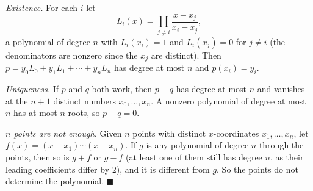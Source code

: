 \emph{Existence.} For each $i$ let
\[L_i(x)=\prod_{j\ne i}\dfrac{x-x_j}{x_i-x_j},\]
a polynomial of degree $n$ with $L_i(x_i)=1$ and $L_i(x_j)=0$ for $j\ne i$ (the denominators are nonzero since the $x_j$ are distinct). Then $p=y_0L_0+y_1L_1+\cdots+y_nL_n$ has degree at most $n$ and $p(x_i)=y_i$.

\emph{Uniqueness.} If $p$ and $q$ both work, then $p-q$ has degree at most $n$ and vanishes at the $n+1$ distinct numbers $x_0,\dots,x_n$. A nonzero polynomial of degree at most $n$ has at most $n$ roots, so $p-q=0$.

\emph{$n$ points are not enough.} Given $n$ points with distinct $x$-coordinates $x_1,\dots,x_n$, let $f(x)=(x-x_1)\cdots(x-x_n)$. If $g$ is any polynomial of degree $n$ through the points, then so is $g+f$ or $g-f$ (at least one of them still has degree $n$, as their leading coefficients differ by $2$), and it is different from $g$. So the points do not determine the polynomial. $\blacksquare$
